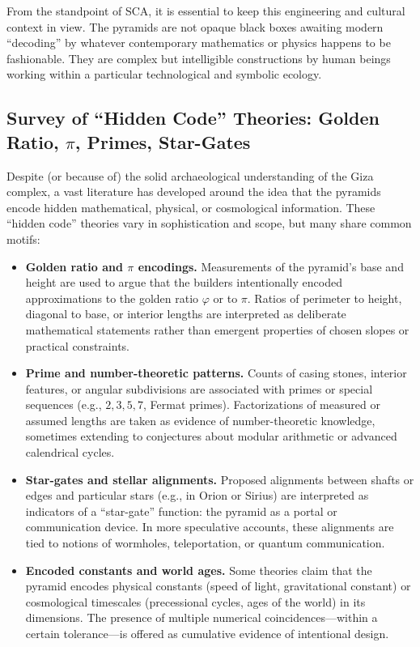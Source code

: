 \documentclass[12]{amsart}
\theoremstyle{plain}
\begin{document}
From the standpoint of SCA, it is essential to keep this engineering and cultural context in view. The pyramids are not opaque black boxes awaiting modern ``decoding'' by whatever contemporary mathematics or physics happens to be fashionable. They are complex but intelligible constructions by human beings working within a particular technological and symbolic ecology.

\subsection{Survey of ``Hidden Code'' Theories: Golden Ratio, $\pi$, Primes, Star-Gates}

Despite (or because of) the solid archaeological understanding of the Giza complex, a vast literature has developed around the idea that the pyramids encode hidden mathematical, physical, or cosmological information. These ``hidden code'' theories vary in sophistication and scope, but many share common motifs:

\begin{itemize}
  \item \textbf{Golden ratio and $\pi$ encodings.} Measurements of the pyramid's base and height are used to argue that the builders intentionally encoded approximations to the golden ratio $\varphi$ or to $\pi$. Ratios of perimeter to height, diagonal to base, or interior lengths are interpreted as deliberate mathematical statements rather than emergent properties of chosen slopes or practical constraints.
  \item \textbf{Prime and number-theoretic patterns.} Counts of casing stones, interior features, or angular subdivisions are associated with primes or special sequences (e.g., $2,3,5,7$, Fermat primes). Factorizations of measured or assumed lengths are taken as evidence of number-theoretic knowledge, sometimes extending to conjectures about modular arithmetic or advanced calendrical cycles.
  \item \textbf{Star-gates and stellar alignments.} Proposed alignments between shafts or edges and particular stars (e.g., in Orion or Sirius) are interpreted as indicators of a ``star-gate'' function: the pyramid as a portal or communication device. In more speculative accounts, these alignments are tied to notions of wormholes, teleportation, or quantum communication.
  \item \textbf{Encoded constants and world ages.} Some theories claim that the pyramid encodes physical constants (speed of light, gravitational constant) or cosmological timescales (precessional cycles, ages of the world) in its dimensions. The presence of multiple numerical coincidences---within a certain tolerance---is offered as cumulative evidence of intentional design.
\end{itemize}
\end{document}
